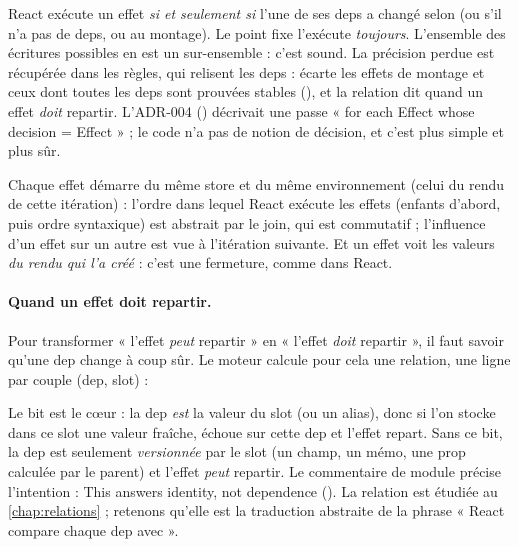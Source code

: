 \begin{decision}
React exécute un effet \emph{si et seulement si} l'une de ses deps a changé
selon  (ou s'il n'a pas de deps, ou au montage). Le point fixe
l'exécute \emph{toujours}. L'ensemble des écritures possibles en est un
sur-ensemble : c'est sound. La précision perdue est récupérée dans les règles,
qui relisent les deps :  écarte les effets de montage et
ceux dont toutes les deps sont prouvées stables
(), et la relation
 dit quand un effet \emph{doit} repartir. L'ADR-004
() décrivait une passe « for each Effect whose decision = Effect » ; le
code n'a pas de notion de décision, et c'est plus simple et plus sûr.
\end{decision}

Chaque effet démarre du même store et du même environnement (celui du rendu de
cette itération) : l'ordre dans lequel React exécute les effets (enfants
d'abord, puis ordre syntaxique) est abstrait par le join, qui est commutatif ;
l'influence d'un effet sur un autre est vue à l'itération suivante. Et un effet
voit les valeurs \emph{du rendu qui l'a créé} : c'est une fermeture, comme dans
React.

\paragraph{Quand un effet doit repartir.} Pour transformer « l'effet
\emph{peut} repartir » en « l'effet \emph{doit} repartir », il faut savoir
qu'une dep change à coup sûr. Le moteur calcule pour cela une relation, une
ligne par couple (dep, slot) :


Le bit  est le cœur : la dep \emph{est} la valeur du slot (ou un
alias), donc si l'on stocke dans ce slot une valeur fraîche, 
échoue sur cette dep et l'effet repart. Sans ce bit, la dep est seulement
\emph{versionnée} par le slot (un champ, un mémo, une prop calculée par le
parent) et l'effet \emph{peut} repartir. Le commentaire de module précise
l'intention : \og This answers identity, not dependence\fg{}
(). La relation est étudiée au
\cref{chap:relations} ; retenons qu'elle est la traduction abstraite de la
phrase « React compare chaque dep avec  ».

